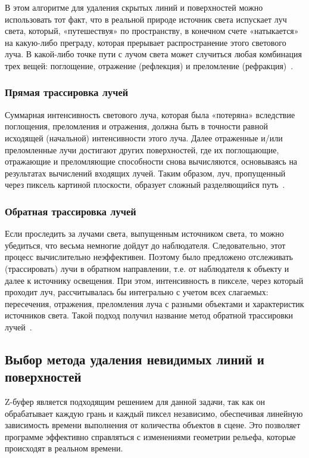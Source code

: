 В этом алгоритме для удаления скрытых линий и поверхностей можно
использовать тот факт, что в реальной природе источник света
испускает луч света, который, «путешествуя» по пространству, в
конечном счете «натыкается» на какую-либо преграду, которая
прерывает распространение этого светового луча. В какой-либо точке
пути с лучом света может случиться любая комбинация трех вещей:
поглощение, отражение (рефлекция) и преломление (рефракция)~\cite{dem_cg}.

\subsubsection{Прямая трассировка лучей}

Суммарная интенсивность светового луча, которая была «потеряна»
вследствие поглощения, преломления и отражения, должна быть в
точности равной исходящей (начальной) интенсивности этого луча.
Далее отраженные и/или преломленные лучи достигают других
поверхностей, где их поглощающие, отражающие и преломляющие
способности снова вычисляются, основываясь на результатах
вычислений входящих лучей. Таким образом, луч, пропущенный через
пиксель картиной плоскости, образует сложный разделяющийся путь~\cite{dem_cg}.

\subsubsection{Обратная трассировка лучей}

Если проследить за лучами света, выпущенным
источником света, то можно убедиться, что весьма немногие дойдут до
наблюдателя. Следовательно, этот процесс вычислительно
неэффективен. Поэтому было предложено отслеживать (трассировать)
лучи в обратном направлении, т.е. от наблюдателя к объекту и далее к
источнику освещения. При этом, интенсивность в пикселе,
через который проходит луч, рассчитывалась бы интегрально с учетом
всех слагаемых: пересечения, отражения, преломления луча с разными
объектами и характеристик источников света. Такой подход получил
название метод обратной трассировки лучей~\cite{dem_cg}.

\subsection{Выбор метода удаления невидимых линий и поверхностей}

Z-буфер является подходящим решением для данной задачи, так как он обрабатывает каждую грань и каждый пиксел независимо,
обеспечивая линейную зависимость времени выполнения от количества объектов в сцене.
Это позволяет программе эффективно справляться с изменениями геометрии рельефа, которые происходят в реальном времени.

